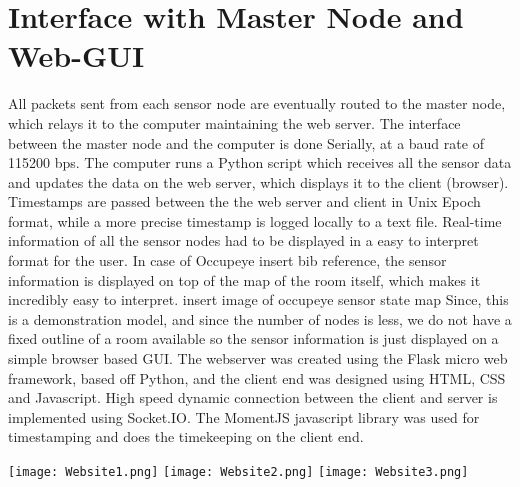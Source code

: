 \section{Interface with Master Node and Web-GUI}
All packets sent from each sensor node are eventually routed to the master node, which relays it to the computer maintaining the web server. The interface between the master node and the computer is done Serially, at a baud rate of 115200 bps. The computer runs a Python script which receives all the sensor data and updates the data on the web server, which displays it to the client (browser). Timestamps are passed between the the web server and client in Unix Epoch format, while a more precise timestamp is logged locally to a text file. 
Real-time information of all the sensor nodes had to be displayed in a easy to interpret format for the user. In case of Occupeye {insert bib reference}, the sensor information is displayed on top of the map of the room itself, which makes it incredibly easy to interpret. 
{insert image of occupeye sensor state map}
Since, this is a demonstration model, and since the number of nodes is less, we do not have a fixed outline of a room available so the sensor information is just displayed on a simple browser based GUI.
The webserver was created using the Flask micro web framework, based off Python, and the client end was designed using HTML, CSS and Javascript. High speed dynamic connection between the client and server is implemented using Socket.IO. The MomentJS javascript library was used for timestamping and does the timekeeping on the client end.


\texttt{[image: Website1.png]}
\texttt{[image: Website2.png]}
\texttt{[image: Website3.png]}